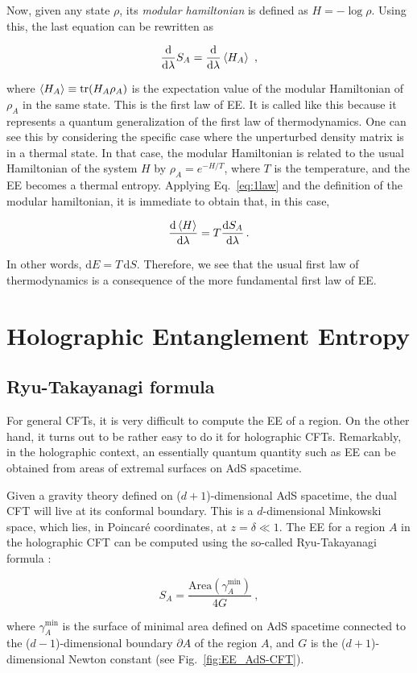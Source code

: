 \documentclass[twocolumn]{revtex4-2}
\providecommand{\eq}[2]{
    \begin{equation}
        #2
    \label{eq:#1}
    \end{equation}
}
\DeclareMathOperator{\tr}{tr}
\begin{document}
Now, given any state $\rho$, its \emph{modular hamiltonian} is defined as $H = - \log \rho$. %
Using this, the last equation can be rewritten  as
\eq{1law}{
    \frac{\mathrm{d}}{\mathrm{d} \lambda} S_A = \frac{\mathrm{d}}{\mathrm{d} \lambda} \braket{H_A} \ ,
}
where $\braket{H_A} \equiv \tr (H_A \rho_A)$ is the expectation value of the modular Hamiltonian of $\rho_A$ in the same state. This is the first law of EE. It is called like this because it represents a quantum generalization of the first law of thermodynamics. One can see this by considering the specific case where the unperturbed density matrix is in a  thermal state. In that case, the modular Hamiltonian is related to the usual Hamiltonian of the system $H$ by
$
    \rho_A =  e^{-H/T} 
$, where $T$ is the temperature,
and the EE becomes a thermal entropy. Applying Eq.~\ref{eq:1law} and the definition of the modular hamiltonian, it is immediate to obtain that, in this case,
\eq{1law_thermo}{
    \frac{\mathrm{d}\braket{H}}{\mathrm{d} \lambda}  =  T \frac{\mathrm{d}S_A}{\mathrm{d} \lambda}  \, .
}
In other words, $\mathrm{d} E = T \, \mathrm{d} S$. Therefore, we see that the usual first law of thermodynamics is a consequence of  the more fundamental first law of EE.


\section{Holographic Entanglement Entropy} \label{s:EE_Holo}


\subsection{Ryu-Takayanagi formula} \label{ss:R-T}

For general CFTs, it is very difficult to compute the EE of a region. On the other hand, it turns out to be rather easy to do it for holographic CFTs. Remarkably, in the holographic context, an essentially quantum quantity such as EE can be obtained from areas of extremal surfaces on AdS spacetime.

Given a gravity theory defined on ($d+1$)-dimensional AdS spacetime, the dual CFT will live at its conformal boundary. This is a $d$-dimensional Minkowski space, which lies, in Poincar\'e coordinates, at 
$z=\delta \ll 1$. The EE for a region $A$ in the holographic CFT can be computed using the so-called Ryu-Takayanagi formula \cite{ryu_holographic_2008}:
\eq{EE_RT}{
    S_A = \frac{ \text{Area}(\gamma_A^\text{min}) }{ 4 G } \ ,
}
where $\gamma_A^\text{min}$ is the surface of minimal area defined on AdS spacetime connected to the ($d-1$)-dimensional boundary $\partial A$ of the region $A$, and $G$ is the ($d+1$)-dimensional Newton constant (see Fig.~\ref{fig:EE_AdS-CFT}).
\end{document}
